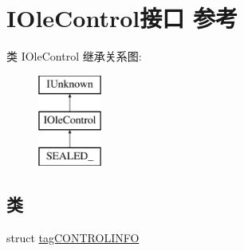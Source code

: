 \hypertarget{interface_i_ole_control}{}\section{I\+Ole\+Control接口 参考}
\label{interface_i_ole_control}
类 I\+Ole\+Control 继承关系图\+:\begin{figure}[H]
\begin{center}
\leavevmode
\includegraphics[height=3.000000cm]{interface_i_ole_control}
\end{center}
\end{figure}
\subsection*{类}
\begin{DoxyCompactItemize}
\item 
struct \hyperlink{struct_i_ole_control_1_1tag_c_o_n_t_r_o_l_i_n_f_o}{tag\+C\+O\+N\+T\+R\+O\+L\+I\+N\+FO}
\end{DoxyCompactItemize}
